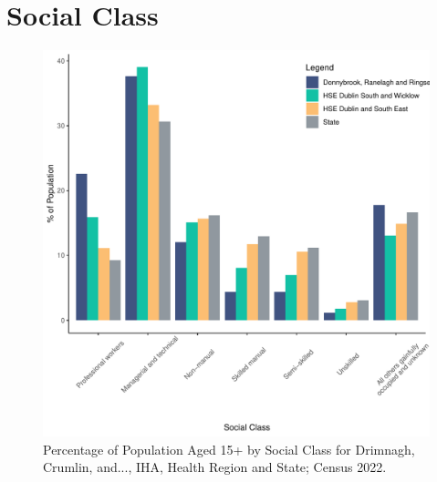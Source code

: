 \documentclass{article}
\begin{document}
\section{Social Class}\label{sect:SC}
\begin{figure}[H]
	\centering
	\includegraphics[width = 140mm]{../figures/SocialClassED.pdf}
	\caption{Percentage of Population Aged 15+ by Social Class for Drimnagh, Crumlin, and..., IHA, Health Region and State; Census 2022.}
	\label{fig:vbnv}
	\end{figure}
\end{document}
